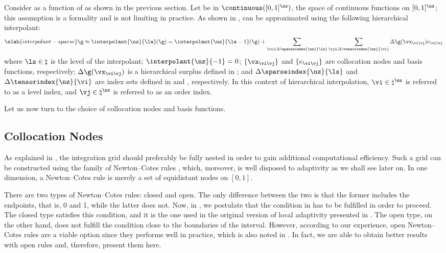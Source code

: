 Consider \g as a function of \vz as shown in the previous section. Let \g be in
$\continuous([0, 1]^\nz)$, the space of continuous functions on $[0, 1]^\nz$;
this assumption is a formality and is not limiting in practice. As shown in
, \g can be approximated using the following
hierarchical interpolant:
\begin{equation} \elab{interpolant-sparse}
  \g \approx \interpolant{\nz}{\ls}(\g)
  = \interpolant{\nz}{\ls - 1}(\g) + \sum_{\vi \in \Delta\sparseindex{\nz}{\ls}} \sum_{\vj \in \Delta\tensorindex{\nz}{\vi}} \Delta\g(\vx_{\vi \vj}) e_{\vi \vj}
\end{equation}
where $\ls \in \natural$ is the level of the interpolant; $\interpolant{\nz}{-1}
= 0$; $\{ \vx_{\vi \vj} \}$ and $\{ e_{\vi \vj} \}$ are collocation nodes and
basis functions, respectively; $\Delta\g(\vx_{\vi \vj})$ is a hierarchical
surplus defined in ; and
$\Delta\sparseindex{\nz}{\ls}$ and $\Delta\tensorindex{\nz}{\vi}$ are index sets
defined in  and
, respectively. In this context of
hierarchical interpolation, $\vi \in \natural^\nz$ is referred to as a level
index, and $\vj \in \natural^\nz$ is referred to as an order index.

Let us now turn to the choice of collocation nodes and basis functions.

\subsection{Collocation Nodes}

As explained in , the integration grid should
preferably be fully nested in order to gain additional computational efficiency.
Such a grid can be constructed using the family of Newton--Cotes rules
\cite{ma2009}, which, moreover, is well disposed to adaptivity as we shall see
later on. In one dimension, a Newton--Cotes rule is merely a set of equidistant
nodes on $[0, 1]$.

There are two types of Newton--Cotes rules: closed and open. The only difference
between the two is that the former includes the endpoints, that is, 0 and 1,
while the latter does not. Now, in , we postulate
that the condition in  has to be fulfilled in
order to proceed. The closed type satisfies this condition, and it is the one
used in the original version of local adaptivity presented in \cite{ma2009}. The
open type, on the other hand, does not fulfill the condition close to the
boundaries of the interval. However, according to our experience, open
Newton--Cotes rules are a viable option since they performs well in practice,
which is also noted in \cite{klimke2006}. In fact, we are able to obtain better
results with open rules and, therefore, present them here.

